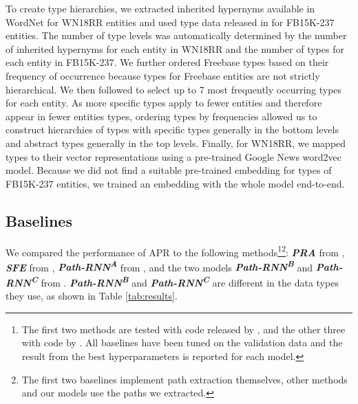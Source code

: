 \documentclass[letterpaper]{article} %
\begin{document}
To create type hierarchies, we extracted inherited hypernyms available in WordNet \cite{wordnet} for WN18RR entities and used type data released in \cite{fb_types} for FB15K-237 entities. The number of type levels was automatically determined by the number of inherited hypernyms for each entity in WN18RR and the number of types for each entity in FB15K-237. We further ordered Freebase types based on their frequency of occurrence because types for Freebase entities are not strictly hierarchical. We then followed \cite{chains} to select up to 7 most frequently occurring types for each entity. As more specific types apply to fewer entities and therefore appear in fewer entities types, ordering types by frequencies allowed us to construct hierarchies of types with specific types generally in the bottom levels and abstract types generally in the top levels. Finally, for WN18RR, we mapped types to their vector representations using a pre-trained Google News word2vec model. Because we did not find a suitable pre-trained embedding for types of FB15K-237 entities, we trained an embedding with the whole model end-to-end. 

\subsection{Baselines}
We compared the performance of APR to the following  methods\footnote{The first two methods are tested with code released by \citeauthor{sfe}, and the other three with code by \citeauthor{chains}. All baselines have been tuned on the validation data and the result from the best hyperparameters is reported for each model.}\footnote{The first two baselines implement path extraction themselves, other methods and our models use the paths we extracted.}: \textit{\textbf{PRA}} from \cite{pra}, \textit{\textbf{SFE}} from \cite{sfe}, \textit{\textbf{Path-RNN\textsuperscript{A}}} from \cite{cvsm}, and the two models \textit{\textbf{Path-RNN\textsuperscript{B}}} and \textit{\textbf{Path-RNN\textsuperscript{C}}} from \cite{chains}. \textit{\textbf{Path-RNN\textsuperscript{B}}} and \textit{\textbf{Path-RNN\textsuperscript{C}}} are different in the data types they use, as shown in Table \ref{tab:results}.

\end{document}
